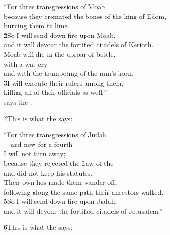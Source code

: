 \begin{poetry}
\poeml ``For three transgressions of Moab \\
\poeml because they cremated the bones of the king of Edom, \\
\poemll    burning them to lime. \\
\poeml \v{2}So I will send down fire upon Moab, \\
\poemll    and it will devour the fortified citadels of Kerioth. \\
\poeml Moab will die in the uproar of battle, \\
\poemll    with a war cry \\
\poemlll       and with the trumpeting of the ram's horn. \\
\poeml \v{3}I will execute their rulers among them, \\
\poemll    killing all of their officials as well,'' \\
\poemlll       says the .
\end{poetry}

\v{4}This is what the  says:

\begin{poetry}
\poeml ``For three transgressions of Judah \\
\poemll    ---and now for a fourth--- \\
\poemlll       I will not turn away; \\
\poeml because they rejected the Law of the  \\
\poemll    and did not keep his statutes. \\
\poeml Their own lies made them wander off, \\
\poemll    following along the same path their ancestors walked. \\
\poeml \v{5}So I will send down fire upon Judah, \\
\poemll    and it will devour the fortified citadels of Jerusalem.''
\end{poetry}

\v{6}This is what the  says:

